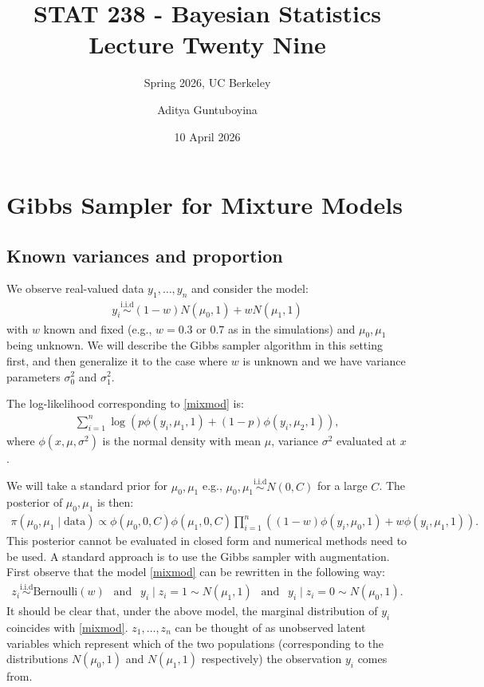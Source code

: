 \documentclass{scrartcl}
\begin{document}
\title{STAT 238 - Bayesian Statistics  \\
  Lecture Twenty Nine} 
\subtitle{Spring 2026, UC Berkeley}

\author{Aditya Guntuboyina}


\date{10 April 2026}

\maketitle

\section{Gibbs Sampler for Mixture Models}

\subsection{Known variances and proportion}

We observe real-valued data $y_1, \dots, y_n$ and consider the model:
\begin{align}\label{mixmod}
  y_i \overset{\text{i.i.d}}{\sim} (1 - w) N(\mu_0, 1) + w N(\mu_1, 1)
\end{align}
with $w$ known and fixed (e.g., $w = 0.3$ or $0.7$ as in the simulations) and
$\mu_0, \mu_1$ being unknown. We will describe the Gibbs sampler
algorithm in this setting first, and then generalize it to the case
where $w$ is unknown and we have variance parameters $\sigma_0^2$ and
$\sigma_1^2$. 

The log-likelihood corresponding to \eqref{mixmod} is:
\begin{align*}
  \sum_{i=1}^n \log \left(p \phi(y_i, \mu_1, 1) + (1 - p) \phi(y_i,
  \mu_2, 1) \right), 
\end{align*}
where $\phi(x, \mu, \sigma^2)$ is the normal density with mean $\mu$,
variance $\sigma^2$ evaluated at $x$.


We will take a standard prior for $\mu_0, \mu_1$ e.g., $\mu_0, \mu_1
\overset{\text{i.i.d}}{\sim} N(0, C)$ for a large $C$. The posterior
of $\mu_0, \mu_1$ is then:
\begin{align*}
\pi(\mu_0, \mu_1 \mid \text{data}) \propto \phi(\mu_0, 0, C) \phi(\mu_1,
  0, C) \prod_{i=1}^n \left((1 - w) \phi(y_i, \mu_0, 1) + w \phi(y_i,
  \mu_1, 1) \right). 
\end{align*}
This posterior cannot be evaluated in closed form and numerical
methods need to be used. A standard approach is to use the Gibbs
sampler with augmentation. First observe that the model \eqref{mixmod}
can be rewritten in the following way: 
\begin{align*}
  z_i \overset{\text{i.i.d}}{\sim} \text{Bernoulli}(w) ~~ \text{ and }
  ~~ y_i \mid z_i = 1 \sim N(\mu_1, 1) ~~ \text{ and } ~~ y_i \mid z_i
  = 0 \sim N(\mu_0, 1). 
\end{align*}
It should be clear that, under the above model, the marginal
distribution of $y_i$ coincides with \eqref{mixmod}. $z_1, \dots, z_n$
can be thought of as unobserved latent variables which represent which
of the two populations (corresponding to the distributions $N(\mu_0,
1)$ and $N(\mu_1, 1)$ respectively) the observation $y_i$ comes from.
\end{document}
